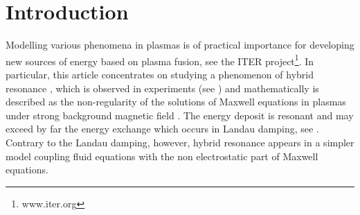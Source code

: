 \section{Introduction}
Modelling various phenomena in plasmas is of practical importance for developing new sources of energy 
based on plasma fusion, see the ITER project\footnote{www.iter.org}. 
In particular, this article concentrates on studying a phenomenon of hybrid resonance \cite{Stix}, 
which is observed in experiments (see \cite{reflectometers_2006, reflectometers_2010, Dumont_2005}) and 
mathematically is described as the non-regularity of
the solutions of Maxwell equations in plasmas under strong background magnetic field \cite{Despres_2014}. 
The energy deposit is resonant and may exceed by far the energy 
exchange which occurs in Landau damping, see \cite{Freidberg_2007,Mouhot_2011}. 
Contrary to the Landau damping, however, 
hybrid resonance appears in a simpler model coupling 
fluid equations with the non electrostatic part of Maxwell equations.


